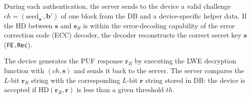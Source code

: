 During each authentication, the server sends to the device a valid challenge  $ch=(\text{seed}_{\mathbf{a}^\prime}, \mathbf{b}')$ of one block from the DB and a device-specific helper data. 
If the HD between $\mathbf{s}$ and $\mathbf{s}_R$ is within the error-decoding capability of the error correction code (ECC) decoder, the decoder reconstructs the correct secret key $\mathbf{s}$ (\texttt{FE.Rec}). 

The device generates the PUF response $\mathbf{r}_R$ by executing the LWE decryption function with $(ch, \mathbf{s})$ and sends it back to the server. 
The server compares the $L$-bit $\mathbf{r}_R$ string with the corresponding $L$-bit $\mathbf{r}$ string stored in DB:
the device is accepted if $\text{HD}(\mathbf{r}_R, \mathbf{r})$ is less than a given threshold $th$.
